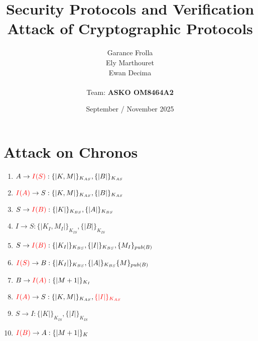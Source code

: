 \documentclass[11pt]{article}
\begin{document}
    \title{
            { \textbf{Security Protocols and Verification}} \\[1ex]
        {\small Attack of Cryptographic Protocols}
    }


    \author{
        Garance Frolla \\
        Ely Marthouret \\
        Ewan Decima\\ \\
        Team: \textbf{ASKO OM8464A2}
    }

    \date{September / November 2025}


    \maketitle
    \tableofcontents
    \newpage



    \section{Attack on Chronos}

    \begin{enumerate}
        \item $A \rightarrow \textcolor{red}{I(S)} : \{| K, M |\}_{K_{AS}}, \{|B|\}_{K_{AS}}$
        \item $\textcolor{red}{I(A)} \rightarrow S : \{| K, M |\}_{K_{AS}}, \{|B|\}_{K_{AS}}$
        \item $S \rightarrow \textcolor{red}{I(B)} : \{| K |\}_{K_{BS}}, \{|A|\}_{K_{BS}}$
        \item $I \rightarrow S : \{| K_I, M_I |\}_{K_{IS}}, \{|B|\}_{K_{IS}}$
        \item $S \rightarrow \textcolor{red}{I(B)} : \{|K_I|\}_{K_{BS}}, \{|I|\}_{K_{BS}}, \{M_I\}_{pub(B)}$
        \item $\textcolor{red}{I(S)} \rightarrow B : \{|K_I|\}_{K_{BS}}, \{|A|\}_{K_{BS}} \{M\}_{pub(B)}$
        \item $B \rightarrow \textcolor{red}{I(A)} : \{|M+1|\}_{K_I}$
        \item $\textcolor{red}{I(A)} \rightarrow S: \{| K, M |\}_{K_{AS}}, \textcolor{red}{\{|I|\}_{K_{AS}}}$
        \item $S \rightarrow I : \{|K|\}_{K_{IS}}, \{|I|\}_{K_{IS}}$
        \item $\textcolor{red}{I(B)} \rightarrow A : \{|M+1|\}_K$

    \end{enumerate}
\end{document}
